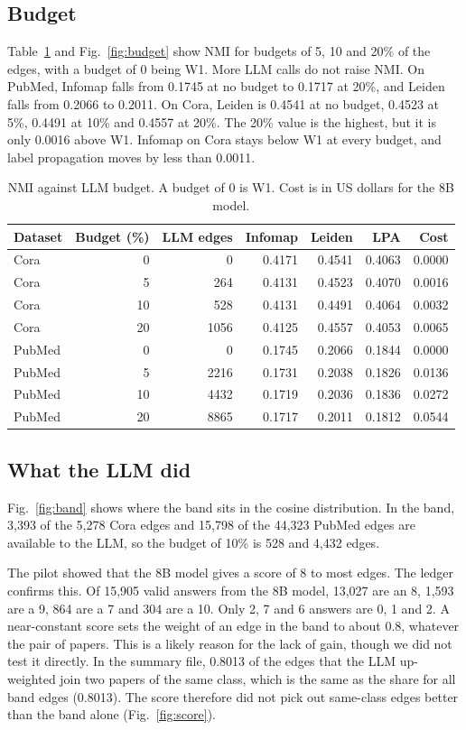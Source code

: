 \subsection{Budget}
Table~\ref{tab:budget} and Fig.~\ref{fig:budget} show NMI for budgets of 5, 10 and 20\% of the edges, with a budget of 0 being W1. More LLM calls do not raise NMI. On PubMed, Infomap falls from 0.1745 at no budget to 0.1717 at 20\%, and Leiden falls from 0.2066 to 0.2011. On Cora, Leiden is 0.4541 at no budget, 0.4523 at 5\%, 0.4491 at 10\% and 0.4557 at 20\%. The 20\% value is the highest, but it is only 0.0016 above W1. Infomap on Cora stays below W1 at every budget, and label propagation moves by less than 0.0011.

\begin{table}[!t]
\centering
\caption{NMI against LLM budget. A budget of 0 is W1. Cost is in US dollars for the 8B model.}
\label{tab:budget}
\footnotesize
\begin{tabular}{@{}lrrrrrr@{}}
\toprule
Dataset & Budget (\%) & LLM edges & Infomap & Leiden & LPA & Cost \\
\midrule
Cora & 0 & 0 & 0.4171 & 0.4541 & 0.4063 & 0.0000 \\
Cora & 5 & 264 & 0.4131 & 0.4523 & 0.4070 & 0.0016 \\
Cora & 10 & 528 & 0.4131 & 0.4491 & 0.4064 & 0.0032 \\
Cora & 20 & 1056 & 0.4125 & 0.4557 & 0.4053 & 0.0065 \\
PubMed & 0 & 0 & 0.1745 & 0.2066 & 0.1844 & 0.0000 \\
PubMed & 5 & 2216 & 0.1731 & 0.2038 & 0.1826 & 0.0136 \\
PubMed & 10 & 4432 & 0.1719 & 0.2036 & 0.1836 & 0.0272 \\
PubMed & 20 & 8865 & 0.1717 & 0.2011 & 0.1812 & 0.0544 \\
\bottomrule
\end{tabular}
\end{table}


\subsection{What the LLM did}
Fig.~\ref{fig:band} shows where the band sits in the cosine distribution. In the band, 3,393 of the 5,278 Cora edges and 15,798 of the 44,323 PubMed edges are available to the LLM, so the budget of 10\% is 528 and 4,432 edges.

The pilot showed that the 8B model gives a score of 8 to most edges. The ledger confirms this. Of 15,905 valid answers from the 8B model, 13,027 are an 8, 1,593 are a 9, 864 are a 7 and 304 are a 10. Only 2, 7 and 6 answers are 0, 1 and 2. A near-constant score sets the weight of an edge in the band to about 0.8, whatever the pair of papers. This is a likely reason for the lack of gain, though we did not test it directly. In the summary file, 0.8013 of the edges that the LLM up-weighted join two papers of the same class, which is the same as the share for all band edges (0.8013). The score therefore did not pick out same-class edges better than the band alone (Fig.~\ref{fig:score}).

